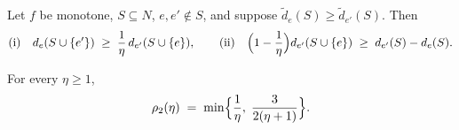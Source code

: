 \begin{lemma}[Coherence]\label{lem:coherence}
Let $f$ be monotone, $S\subseteq N$, $e,e'\notin S$, and suppose
$\tilde d_e(S)\ge \tilde d_{e'}(S)$. Then
\[
 \text{(i)}\quad d_e(S\cup\{e'\}) \;\ge\; \frac{1}{\eta}\, d_{e'}(S\cup\{e\}),
 \qquad
 \text{(ii)}\quad \Bigl(1-\frac{1}{\eta}\Bigr) d_{e'}(S\cup\{e\})
   \;\ge\; d_{e'}(S) - d_{e}(S).
\]
\end{lemma}

\begin{theorem}[Exact ratio for $K=2$]\label{thm:k2}
For every $\eta\ge 1$,
\[
  \rho_2(\eta) \;=\; \min\Bigl\{\frac{1}{\eta},\; \frac{3}{2(\eta+1)}\Bigr\}.
\]
\end{theorem}


